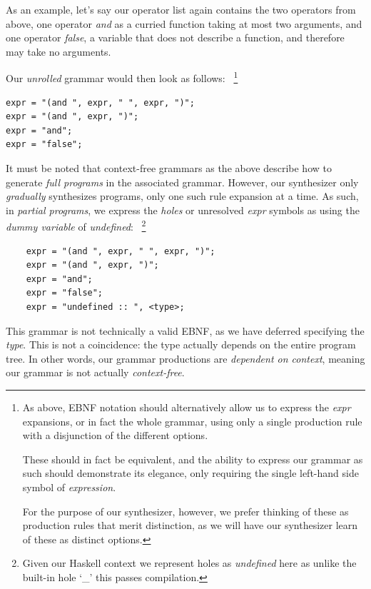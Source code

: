 \documentclass{article}
\begin{document}
As an example, let's say our operator list again contains the two operators from above,
one operator \emph{and} as a curried function taking at most two arguments,
and one operator \emph{false}, a variable that does not describe a function,
and therefore may take no arguments.

Our \emph{unrolled} grammar would then look as follows:%
~\footnote{
    As above, EBNF notation should alternatively allow us to express
    the \emph{expr} expansions, or in fact the whole grammar,
    using only a single production rule with a disjunction of the different options.
    
    These should in fact be equivalent,
    and the ability to express our grammar as such should demonstrate its elegance,
    only requiring the single left-hand side symbol of \emph{expression}.

    For the purpose of our synthesizer, however,
    we prefer thinking of these as production rules that merit distinction,
    as we will have our synthesizer learn of these as distinct options.
}

\begin{verbatim}
expr = "(and ", expr, " ", expr, ")";
expr = "(and ", expr, ")";
expr = "and";
expr = "false";
\end{verbatim}

It must be noted that context-free grammars as the above
describe how to generate \emph{full programs} in the associated grammar.
However, our synthesizer only \emph{gradually} synthesizes programs,
only one such rule expansion at a time.
As such, in \emph{partial programs},
we express the \emph{holes} or unresolved \emph{expr} symbols as
using the \emph{dummy variable} of \emph{undefined}:%
~\footnote{
    Given our Haskell context we represent holes as \emph{undefined} here
    as unlike the built-in hole `\_' this passes compilation.
}

\begin{verbatim}
    expr = "(and ", expr, " ", expr, ")";
    expr = "(and ", expr, ")";
    expr = "and";
    expr = "false";
    expr = "undefined :: ", <type>;
\end{verbatim}

This grammar is not technically a valid EBNF,
as we have deferred specifying the \emph{type}.
This is not a coincidence: the type actually depends on the entire program tree.
In other words, our grammar productions are \emph{dependent on context},
meaning our grammar is not actually \emph{context-free}.
\end{document}
